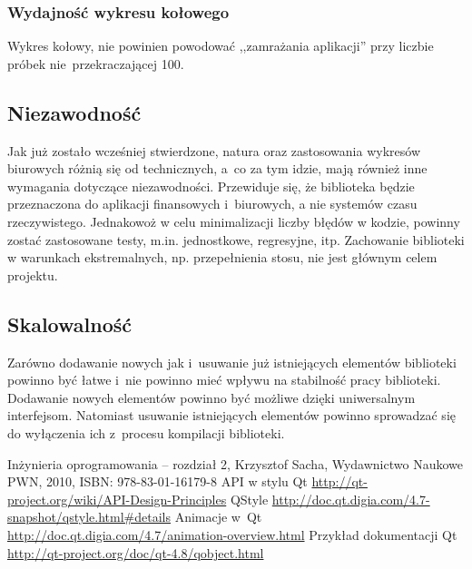 \documentclass[11pt,twoside,a4paper,final]{article}
\begin{document}
\subsubsection{Wydajność wykresu kołowego}
Wykres kołowy, nie powinien powodować ,,zamrażania aplikacji'' przy liczbie próbek nie~przekraczającej 100. 

\subsection{Niezawodność}
Jak już zostało wcześniej stwierdzone, natura oraz zastosowania wykresów biurowych różnią się od technicznych, a~co za tym idzie, mają również inne wymagania dotyczące niezawodności. Przewiduje się, że biblioteka będzie przeznaczona do aplikacji finansowych i~biurowych, a nie systemów czasu rzeczywistego. Jednakowoż w celu minimalizacji liczby błędów w kodzie, powinny zostać zastosowane testy, m.in. jednostkowe, regresyjne, itp. Zachowanie biblioteki w warunkach ekstremalnych, np. przepełnienia stosu, nie jest głównym celem projektu.


\subsection{Skalowalność}
Zarówno dodawanie nowych jak i~usuwanie już istniejących elementów biblioteki powinno być łatwe i~nie powinno mieć wpływu na stabilność pracy biblioteki. Dodawanie nowych elementów powinno być możliwe dzięki uniwersalnym interfejsom. Natomiast usuwanie istniejących elementów powinno sprowadzać się do wyłączenia ich z~procesu kompilacji biblioteki.

\begin{thebibliography}{}
Inżynieria oprogramowania -- rozdział 2, Krzysztof Sacha, Wydawnictwo Naukowe PWN, 2010, ISBN: 978-83-01-16179-8
API w stylu Qt \url{http://qt-project.org/wiki/API-Design-Principles}
QStyle \url{http://doc.qt.digia.com/4.7-snapshot/qstyle.html#details}
Animacje w~Qt \url{http://doc.qt.digia.com/4.7/animation-overview.html}
Przykład dokumentacji Qt \url{http://qt-project.org/doc/qt-4.8/qobject.html}


\end{thebibliography}
\end{document}
